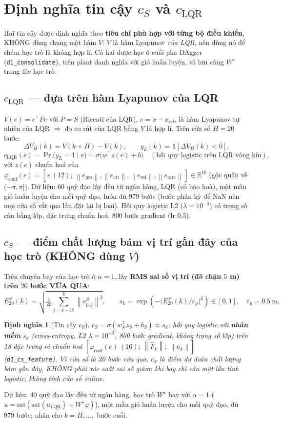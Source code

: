\documentclass[11pt]{article}
\newtheorem{definition}{Định nghĩa}
\newcommand{\R}{\mathbb{R}}
\newcommand{\T}{^{\!\top}}
\newcommand{\norm}[1]{\left\lVert #1 \right\rVert}
\newcommand{\cS}{c_{S}}
\newcommand{\cL}{c_{\mathrm{LQR}}}
\newcommand{\uL}{u_{\mathrm{LQR}}}
\newcommand{\xref}{x_{\mathrm{ref}}}
\begin{document}
\section{Định nghĩa tin cậy $\cS$ và $\cL$}
Hai tin cậy được định nghĩa theo \textbf{tiêu chí phù hợp với từng bộ điều khiển}, KHÔNG dùng chung một
hàm $V$: $V$ là hàm Lyapunov \emph{của LQR}, nên dùng nó để chấm học trò là không hợp lí. Cả hai được học ở cuối
pha DAgger (\texttt{d1\_consolidate}), trên plant danh nghĩa với gió huấn luyện, và lưu cùng $W^\star$ trong file
học trò.

\subsection{$\cL$ --- dựa trên hàm Lyapunov của LQR}
$V(e)=e\T P e$ với $P=S$ (Riccati của LQR), $e=x-\xref$, là hàm Lyapunov tự nhiên của LQR $\Rightarrow$ đo
co rút của LQR bằng $V$ là hợp lí. Trên cửa sổ $H=20$ bước:
\[
\Delta V_H(k)=V(k{+}H)-V(k),\qquad y_L(k)=\mathbf{1}\!\left[\Delta V_H(k)<0\right],
\]
\[
\cL(e)=\Pr\!\big(y_L=1\mid e\big)=\sigma\!\big(w\T z(e)+b\big)\quad(\text{hồi quy logistic trên LQR vòng
kín}),
\]
với $z(e)$ chuẩn hoá của $\varphi_{\mathrm{conf}}(e)=[\,e\,(12);\ \norm{e_{\mathrm{pos}}},\norm{e_{\mathrm{att}}},
\norm{e_{\mathrm{vel}}},\norm{e_{\mathrm{rate}}}\,]\in\R^{16}$ (góc quấn về $(-\pi,\pi]$).
Dữ liệu: 60 quỹ đạo lấy đều từ ngân hàng, LQR (có bão hoà), một mẫu gió huấn luyện cho mỗi quỹ đạo, luôn đủ 979
bước (bước phân kỳ để NaN nên mọi cửa sổ vắt qua lần đặt lại bị loại). Hồi quy logistic L2 ($\lambda=10^{-3}$)
có trọng số cân bằng lớp, đặc trưng chuẩn hoá, 800 bước gradient (lr $0.5$).

\subsection{$\cS$ --- điểm chất lượng bám vị trí gần đây của học trò (KHÔNG dùng $V$)}
Trên chuyến bay của học trò ở $\alpha=1$, lấy \textbf{RMS sai số vị trí (đã chặn $5$ m) trên $20$ bước VỪA QUA}:
\[
E^S_{20}(k)=\sqrt{\tfrac{1}{20}\textstyle\sum_{j=k-19}^{k}\norm{e^S_{p,j}}^2},\qquad
s_k=\exp\!\left(-\big(E^S_{20}(k)/\varepsilon_p\big)^2\right)\in[0,1],\quad \varepsilon_p=0.5\ \mathrm{m}.
\]
\begin{definition}[Tin cậy $\cS$]
$\cS=\sigma(w_S\T z_S+b_S)\approx s_k$: hồi quy logistic với \textbf{nhãn mềm} $s_k$ (cross-entropy, L2
$\lambda=10^{-3}$, 800 bước gradient, không trọng số lớp) trên 18 đặc trưng rẻ chuẩn hoá
$[\varphi_{\mathrm{conf}}(e)\ (16);\ \norm{\hat F_k};\ \norm{\bar u_k}]$ (\texttt{d1\_\allowbreak cs\_\allowbreak feature}). Vì cửa sổ là 20
bước vừa qua, $\cS$ là \emph{điểm dự đoán chất lượng bám gần đây}, KHÔNG phải xác suất sai số giảm; khi bay chỉ
cần một lần tính logistic, không tính cửa sổ online.
\end{definition}
Dữ liệu: 40 quỹ đạo lấy đều từ ngân hàng, học trò $W^\star$ bay với $\alpha=1$
($u=\mathrm{sat}(\mathrm{sat}(\uL)+W^\star\varphi)$), một mẫu gió huấn luyện cho mỗi quỹ đạo, đủ 979 bước;
nhãn cho $k=H,\dots,$ bước cuối.
\end{document}
